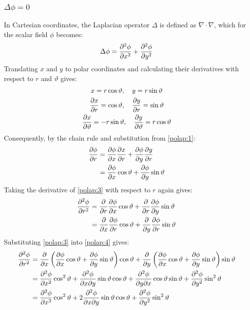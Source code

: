 \documentclass[a4paper,12pt]{article}
\renewcommand{\theta}{\vartheta}      		%
\newcommand{\partialder}[2]{\frac{\partial #1}{\partial #2}}        %
\begin{document}
\subsubsection{$\Delta\phi=0$}
In Cartesian coordinates, the Laplacian operator $\Delta$ is defined as $\nabla\cdot\nabla$, which for the scalar field $\phi$ becomes:
\begin{gather}
	\notag\Delta\phi=\frac{\partial^2\phi}{\partial x^2}+\frac{\partial^2\phi}{\partial y^2}
\end{gather}
Translating $x$ and $y$ to polar coordinates and calculating their derivatives with respect to $r$ and $\theta$ gives:
\begin{gather}
	\notag x=r\cos\theta,\quad y=r\sin\theta\\
	\label{polap:1}\partialder{x}{r}=\cos\theta,\quad\partialder{y}{r}=\sin\theta\\
	\label{polap:2}\partialder{x}{\theta}=-r\sin\theta,\quad\partialder{y}{\theta}=r\cos\theta
\end{gather}
Consequently, by the chain rule and substitution from \ref{polap:1}:
\begin{align}
	\notag\partialder{\phi}{r}&=\partialder{\phi}{x}\partialder{x}{r}+\partialder{\phi}{y}\partialder{y}{r}\\
	\label{polap:3}&=\partialder{\phi}{x}\cos\theta+\partialder{\phi}{y}\sin\theta
\end{align}
Taking the derivative of \ref{polap:3} with respect to $r$ again gives:
\begin{align}
	\notag\frac{\partial^2\phi}{\partial r^2}&=\partialder{}{r}\partialder{\phi}{x}\cos\theta+\partialder{}{r}\partialder{\phi}{y}\sin\theta\\
	\label{polap:4}&=\partialder{}{x}\partialder{\phi}{r}\cos\theta+\partialder{}{y}\partialder{\phi}{r}\sin\theta
\end{align}
Substituting \ref{polap:3} into \ref{polap:4} gives:
\begin{align}
	\notag\frac{\partial^2\phi}{\partial r^2}&=\partialder{}{x}\left(\partialder{\phi}{x}\cos\theta+\partialder{\phi}{y}\sin\theta\right)\cos\theta+\partialder{}{y}\left(\partialder{\phi}{x}\cos\theta+\partialder{\phi}{y}\sin\theta\right)\sin\theta\\
	\notag&=\frac{\partial^2\phi}{\partial x^2}\cos^2\theta+\frac{\partial^2\phi}{\partial x\partial y}\sin\theta\cos\theta+\frac{\partial^2\phi}{\partial y\partial x}\cos\theta\sin\theta+\frac{\partial^2\phi}{\partial y^2}\sin^2\theta\\
	\label{polap:5}&=\frac{\partial^2\phi}{\partial x^2}\cos^2\theta+2\frac{\partial^2\phi}{\partial x\partial y}\sin\theta\cos\theta+\frac{\partial^2\phi}{\partial y^2}\sin^2\theta
\end{align}
\end{document}
